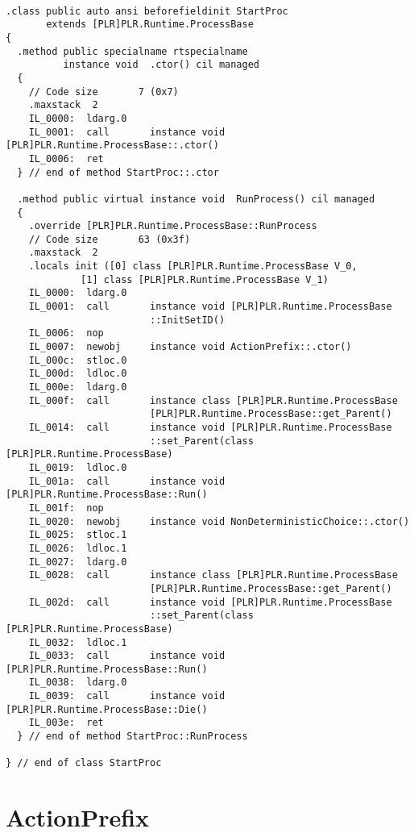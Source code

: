 	\begin{lstlisting}

.class public auto ansi beforefieldinit StartProc
       extends [PLR]PLR.Runtime.ProcessBase
{
  .method public specialname rtspecialname 
          instance void  .ctor() cil managed
  {
    // Code size       7 (0x7)
    .maxstack  2
    IL_0000:  ldarg.0
    IL_0001:  call       instance void [PLR]PLR.Runtime.ProcessBase::.ctor()
    IL_0006:  ret
  } // end of method StartProc::.ctor

  .method public virtual instance void  RunProcess() cil managed
  {
    .override [PLR]PLR.Runtime.ProcessBase::RunProcess
    // Code size       63 (0x3f)
    .maxstack  2
    .locals init ([0] class [PLR]PLR.Runtime.ProcessBase V_0,
             [1] class [PLR]PLR.Runtime.ProcessBase V_1)
    IL_0000:  ldarg.0
    IL_0001:  call       instance void [PLR]PLR.Runtime.ProcessBase
                         ::InitSetID()
    IL_0006:  nop
    IL_0007:  newobj     instance void ActionPrefix::.ctor()
    IL_000c:  stloc.0
    IL_000d:  ldloc.0
    IL_000e:  ldarg.0
    IL_000f:  call       instance class [PLR]PLR.Runtime.ProcessBase 
                         [PLR]PLR.Runtime.ProcessBase::get_Parent()
    IL_0014:  call       instance void [PLR]PLR.Runtime.ProcessBase
                         ::set_Parent(class [PLR]PLR.Runtime.ProcessBase)
    IL_0019:  ldloc.0
    IL_001a:  call       instance void [PLR]PLR.Runtime.ProcessBase::Run()
    IL_001f:  nop
    IL_0020:  newobj     instance void NonDeterministicChoice::.ctor()
    IL_0025:  stloc.1
    IL_0026:  ldloc.1
    IL_0027:  ldarg.0
    IL_0028:  call       instance class [PLR]PLR.Runtime.ProcessBase 
                         [PLR]PLR.Runtime.ProcessBase::get_Parent()
    IL_002d:  call       instance void [PLR]PLR.Runtime.ProcessBase
                         ::set_Parent(class [PLR]PLR.Runtime.ProcessBase)
    IL_0032:  ldloc.1
    IL_0033:  call       instance void [PLR]PLR.Runtime.ProcessBase::Run()
    IL_0038:  ldarg.0
    IL_0039:  call       instance void [PLR]PLR.Runtime.ProcessBase::Die()
    IL_003e:  ret
  } // end of method StartProc::RunProcess

} // end of class StartProc

\end{lstlisting}

\section{ActionPrefix}
	

